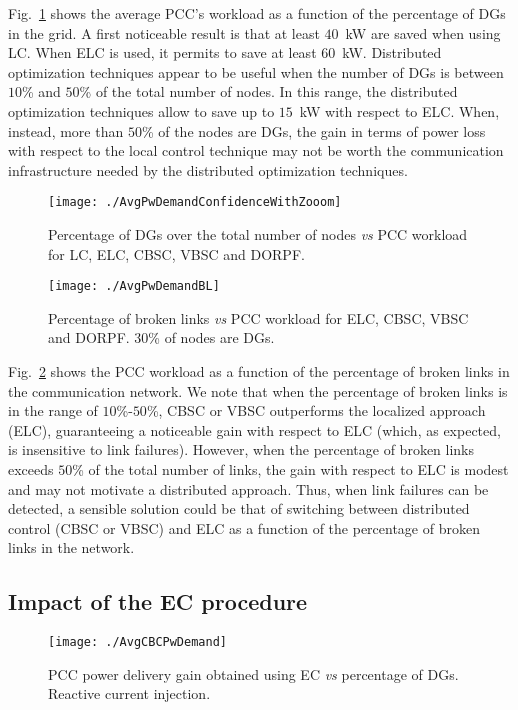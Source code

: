 \documentclass[journal]{IEEEtran}
\newcommand{\fig}[1]{Fig.~\ref{#1}}
\begin{document}
\fig{figure:AVGPW} shows the average PCC's workload as a function of the percentage of DGs in the grid. A first noticeable result is that at least $40$~kW are saved when using LC. When ELC is used, it permits to save at least $60$~kW. Distributed optimization techniques appear to be useful when the number of DGs is between $10$\% and $50$\% of the total number of nodes. In this range, the distributed optimization techniques allow to save up to $15$~kW with respect to ELC. When, instead, more than $50$\% of the nodes are DGs, the gain in terms of power loss with respect to the local control technique may not be worth the communication infrastructure needed by the distributed optimization techniques. 

\begin{figure}
\centering
\texttt{[image: ./AvgPwDemandConfidenceWithZooom]}
\caption{Percentage of DGs over the total number of nodes {\it vs} PCC workload for LC, ELC, CBSC, VBSC and DORPF.\label{figure:AVGPW}}
\end{figure}

\begin{figure}
\centering
\texttt{[image: ./AvgPwDemandBL]}
\caption{Percentage of broken links {\it vs} PCC workload for ELC, CBSC, VBSC and DORPF. 30\% of nodes are DGs.\label{figure:AVGPWBL}}
\end{figure}

\fig{figure:AVGPWBL} shows the PCC workload as a function of the percentage of broken links in the communication network. We note that when the percentage of broken links is in the range of $10$\%-$50$\%, CBSC or VBSC outperforms the localized approach (ELC), guaranteeing a noticeable gain with respect to ELC (which, as expected, is insensitive to link failures). However, when the percentage of broken links exceeds $50$\% of the total number of links, the gain with respect to ELC is modest and may not motivate a distributed approach. Thus, when link failures can be detected, a sensible solution could be that of switching between distributed control (CBSC or VBSC) and ELC as a function of the percentage of broken links in the network.

\subsection{Impact of the EC procedure}
\label{ssec:impEC}

\begin{figure}
\centering
\texttt{[image: ./AvgCBCPwDemand]}
\caption{PCC power delivery gain obtained using EC {\it vs} percentage of DGs. Reactive current injection.
\label{figure:AVGCBCPW}}
\end{figure}
\end{document}
